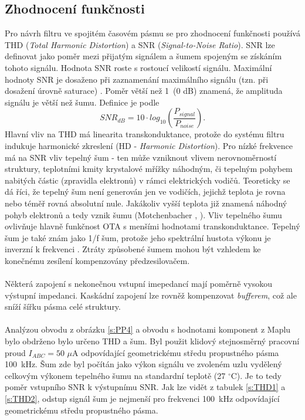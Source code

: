 \subsection{Zhodnocení funkčnosti}
\noindent Pro návrh filtru ve spojitém časovém  pásmu se pro zhodnocení funkčnosti používá THD (\textit{Total Harmonic Distortion}) a SNR (\textit{Signal-to-Noise Ratio}). SNR lze definovat jako poměr mezi přijatým signálem a šumem spojeným se získáním tohoto signálu. Hodnota SNR roste s rostoucí velikostí signálu. Maximální hodnoty SNR je dosaženo při zaznamenání maximálního signálu (tzn. při dosažení úrovně saturace) \cite{21}. Poměr větší než 1~(0 dB) znamená, že amplituda signálu je větší než šumu. Definice je podle \cite{22}
\begin{equation}
SNR_{dB} = 10 \cdot log_{10}\left(\frac{P_{signal}}{P_{noise}}\right).
\end{equation}
 Hlavní vliv na THD má linearita transkonduktance, protože do systému filtru indukuje harmonické zkreslení (HD - \textit{Harmonic Distortion}). Pro nízké frekvence má na SNR vliv tepelný šum - ten může vzniknout vlivem nerovnoměrností struktury, teplotními kmity krystalové mřížky náhodným, či tepelným pohybem nabitých částic (zpravidla elektronů) v rámci elektrických vodičů. Teoreticky se dá říci, že tepelný šum není generován jen ve vodičích, jejichž teplota je rovna nebo téměř rovná absolutní nule. Jakákoliv vyšší teplota již znamená náhodný pohyb elektronů a tedy vznik šumu (Motchenbacher \cite{23}, \cite{24}). Vliv tepelného šumu ovlivňuje hlavně funkčnost OTA s menšími hodnotami transkonduktance. Tepelný šum je také znám jako 1/f šum, protože jeho spektrální hustota výkonu je inverzní k frekvenci \cite{1}. Ztráty způsobené šumem mohou být vzhledem ke konečnému zesílení kompenzovány předzesilovačem. \\
\\
Některá zapojení s nekonečnou vstupní imepedancí mají poměrně vysokou výstupní impedanci. Kaskádní zapojení lze rovněž kompenzovat \textit{bufferem}, což ale sníží šířku pásma celé struktury.\\
\\
Analýzou obvodu z obrázku \ref{s:PP4} a obvodu s hodnotami komponent z Maplu bylo obdrženo bylo určeno THD a šum. Byl použit klidový stejnosměrný pracovní proud $I_{ABC} = 50$ $\mu$A odpovídající geometrickému středu propustného pásma 100~kHz. Šum zde byl počítán jako výkon signálu ve zvoleném uzlu vydělený celkovým výkonem tepelného šumu na standardní teplotě (27 $^{\circ}$C). Je to tedy poměr vstupního SNR k výstupnímu SNR. Jak lze vidět z tabulek \ref{s:THD1} a \ref{s:THD2}, odstup signál šum je nejmenší pro frekvenci 100~kHz odpovídající geometrickému středu propustného pásma.
